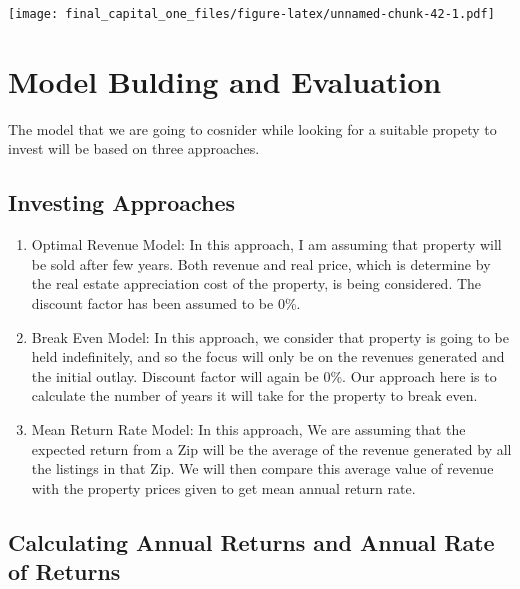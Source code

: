 \documentclass[
]{article}
\providecommand{\tightlist}{%
  \setlength{\itemsep}{0pt}\setlength{\parskip}{0pt}}
\begin{document}
\texttt{[image: final\_capital\_one\_files/figure-latex/unnamed-chunk-42-1.pdf]}

\hypertarget{model-bulding-and-evaluation}{%
\section{Model Bulding and
Evaluation}\label{model-bulding-and-evaluation}}

The model that we are going to cosnider while looking for a suitable
propety to invest will be based on three approaches.

\hypertarget{investing-approaches}{%
\subsection{Investing Approaches}\label{investing-approaches}}

\begin{enumerate}
\def\labelenumi{\arabic{enumi}.}
\tightlist
\item
  Optimal Revenue Model: In this approach, I am assuming that property
  will be sold after few years. Both revenue and real price, which is
  determine by the real estate appreciation cost of the property, is
  being considered. The discount factor has been assumed to be 0\%.
\item
  Break Even Model: In this approach, we consider that property is going
  to be held indefinitely, and so the focus will only be on the revenues
  generated and the initial outlay. Discount factor will again be 0\%.
  Our approach here is to calculate the number of years it will take for
  the property to break even.
\item
  Mean Return Rate Model: In this approach, We are assuming that the
  expected return from a Zip will be the average of the revenue
  generated by all the listings in that Zip. We will then compare this
  average value of revenue with the property prices given to get mean
  annual return rate.
\end{enumerate}

\hypertarget{calculating-annual-returns-and-annual-rate-of-returns}{%
\subsection{Calculating Annual Returns and Annual Rate of
Returns}\label{calculating-annual-returns-and-annual-rate-of-returns}}
\end{document}
